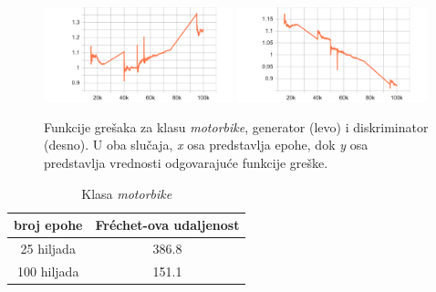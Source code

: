 \documentclass[12pt,oneside]{memoir}
\begin{document}
\begin{figure}[!htbp]
\centering
  \includegraphics[width=0.49\textwidth]{matfmaster/stylegan/motorbike/g_loss.png}
  \includegraphics[width=0.49\textwidth]{matfmaster/stylegan/motorbike/d_loss.png}
\caption{Funkcije grešaka za klasu \textit{motorbike}, generator (levo) i diskriminator (desno). U oba slučaja, \textit{x} osa predstavlja epohe, dok \textit{y} osa predstavlja vrednosti odgovarajuće funkcije greške. }\label{fig:section4_stylegan_motorbike_loss}
\end{figure}


\begin{table}[!htb]
\caption{Klasa \textit{motorbike}}\label{tab:section4_fid_m}
\centering
    \begin{tabular}{c|c}
        broj epohe &  Fréchet-ova udaljenost \\
        \hline
        25 hiljada & 386.8 \\
        \hline
        100 hiljada & 151.1 \\
    \end{tabular}
\end{table}
\end{document}
